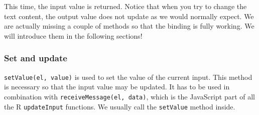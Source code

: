 \documentclass[
]{book}
\newenvironment{Shaded}{\begin{snugshade}}{\end{snugshade}}
\newcommand{\ControlFlowTok}[1]{\textcolor[rgb]{0.13,0.29,0.53}{\textbf{#1}}}
\newcommand{\KeywordTok}[1]{\textcolor[rgb]{0.13,0.29,0.53}{\textbf{#1}}}
\newcommand{\NormalTok}[1]{#1}
\newcommand{\OperatorTok}[1]{\textcolor[rgb]{0.81,0.36,0.00}{\textbf{#1}}}
\newcommand{\StringTok}[1]{\textcolor[rgb]{0.31,0.60,0.02}{#1}}
\begin{document}
\begin{Shaded}
\end{Shaded}

This time, the input value is returned. Notice that when you try to change the text content, the output value does not update as we would normally expect. We are actually missing a couple of methods so that the binding is fully working. We will introduce them in the following sections!

\hypertarget{set-and-update}{%
\subsubsection{Set and update}\label{set-and-update}}

\texttt{setValue(el,\ value)} is used to set the value of the current input. This method is necessary so that the input value may be updated. It has to be used in combination with \texttt{receiveMessage(el,\ data)}, which is the JavaScript part of all the R \texttt{updateInput} functions. We usually call the \texttt{setValue} method inside.
\end{document}
